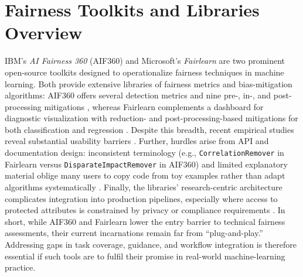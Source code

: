 \documentclass[12pt,a4paper,openright,twoside]{book}
\begin{document}
\section{Fairness Toolkits and Libraries Overview}
IBM’s \textit{AI Fairness 360} (AIF360) and Microsoft’s \textit{Fairlearn} are two prominent open-source toolkits designed to operationalize fairness techniques in machine learning. Both provide extensive libraries of fairness metrics and bias-mitigation algorithms: AIF360 offers several detection metrics and nine pre-, in-, and post-processing mitigations \cite{bellamy2019aif360}, whereas Fairlearn complements a dashboard for diagnostic visualization with reduction- and post-processing-based mitigations for both classification and regression \cite{bird2020fairlearn}. Despite this breadth, recent empirical studies reveal substantial usability barriers \cite{deng2022exploring}. 
Further, hurdles arise from API and documentation design: inconsistent terminology (e.g., \texttt{CorrelationRemover} in Fairlearn versus \texttt{DisparateImpactRemover} in AIF360) and limited explanatory material oblige many users to copy code from toy examples rather than adapt algorithms systematically \cite{deng2022exploring}. Finally, the libraries’ research-centric architecture complicates integration into production pipelines, especially where access to protected attributes is constrained by privacy or compliance requirements \cite{holstein2019}. In short, while AIF360 and Fairlearn lower the entry barrier to technical fairness assessments, their current incarnations remain far from “plug-and-play.” Addressing gaps in task coverage, guidance, and workflow integration is therefore essential if such tools are to fulfil their promise in real-world machine-learning practice.
\end{document}
